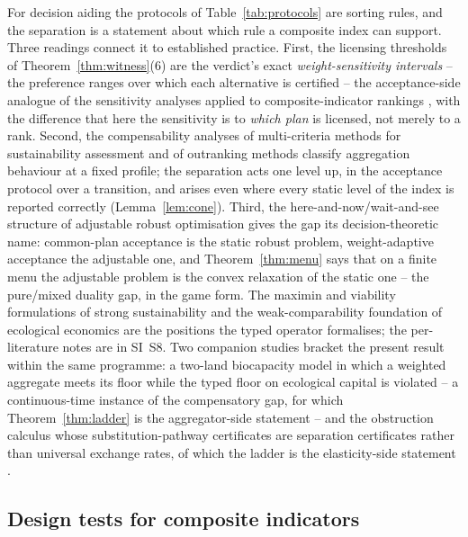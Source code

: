 For decision aiding the protocols of Table~\ref{tab:protocols} are sorting rules, and the separation is a statement about which rule a composite index can support. Three readings connect it to established practice. First, the licensing thresholds of Theorem~\ref{thm:witness}(6) are the verdict's exact \emph{weight-sensitivity intervals} -- the preference ranges over which each alternative is certified -- the acceptance-side analogue of the sensitivity analyses applied to composite-indicator rankings \citep{Nardo2008,Becker2017}, with the difference that here the sensitivity is to \emph{which plan} is licensed, not merely to a rank. Second, the compensability analyses of multi-criteria methods for sustainability assessment \citep{Cinelli2014} and of outranking methods \citep{Schar2025} classify aggregation behaviour at a fixed profile; the separation acts one level up, in the acceptance protocol over a transition, and arises even where every static level of the index is reported correctly (Lemma~\ref{lem:cone}). Third, the here-and-now/wait-and-see structure of adjustable robust optimisation \citep{BenTal2004} gives the gap its decision-theoretic name: common-plan acceptance is the static robust problem, weight-adaptive acceptance the adjustable one, and Theorem~\ref{thm:menu} says that on a finite menu the adjustable problem is the convex relaxation of the static one -- the pure/mixed duality gap, in the game form. The maximin and viability formulations of strong sustainability \citep{Martinet2011,CairnsMartinet2014,DoyenGajardo2020} and the weak-comparability foundation of ecological economics \citep{MartinezAlier1998} are the positions the typed operator formalises; the per-literature notes are in SI~S8. Two companion studies bracket the present result within the same programme: a two-land biocapacity model in which a weighted aggregate meets its floor while the typed floor on ecological capital is violated -- a continuous-time instance of the compensatory gap, for which Theorem~\ref{thm:ladder} is the aggregator-side statement \citep{Abaee2026ecomod} -- and the obstruction calculus whose substitution-pathway certificates are separation certificates rather than universal exchange rates, of which the ladder is the elasticity-side statement \citep{Abaee2026obs}.

\subsection{Design tests for composite indicators}\label{sec:design}

